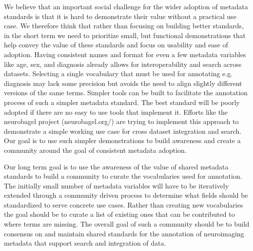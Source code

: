 \documentclass[../main.tex]{subfiles}
\begin{document}
We believe that an important social challenge for the wider adoption of metadata standards is that it is hard to demonstrate their value without a practical use case. We therefore think that rather than focusing on building better standards, in the short term we need to prioritize small, but functional demonstrations that help convey the value of these standards and focus on usability and ease of adoption. Having consistent names and format for even a few metadata variables like age, sex, and diagnosis already allows for interoperability and search across datasets. Selecting a single vocabulary that must be used for annotating e.g. diagnosis may lack some precision but avoids the need to align slightly different versions of the same terms. Simpler tools can be built to facilitate the annotation process of such a simpler metadata standard. The best standard will be poorly adopted if there are no easy to use tools that implement it. Efforts like the neurobagel project (neurobagel.org/) are trying to implement this approach to demonstrate a simple working use case for cross dataset integration and search. Our goal is to use such simpler demonstrations to build awareness and create a community around the goal of consistent metadata adoption.

Our long term goal is to use the awareness of the value of shared metadata standards to build a community to curate the vocabularies used for annotation. The initially small number of metadata variables will have to be iteratively extended through a community driven process to determine what fields should be standardized to serve concrete use cases. Rather than creating new vocabularies the goal should be to curate a list of existing ones that can be contributed to where terms are missing. The overall goal of such a community should be to build consensus on and maintain shared standards for the annotation of neuroimaging metadata that support search and integration of data.

\printbibliography
\end{document}
